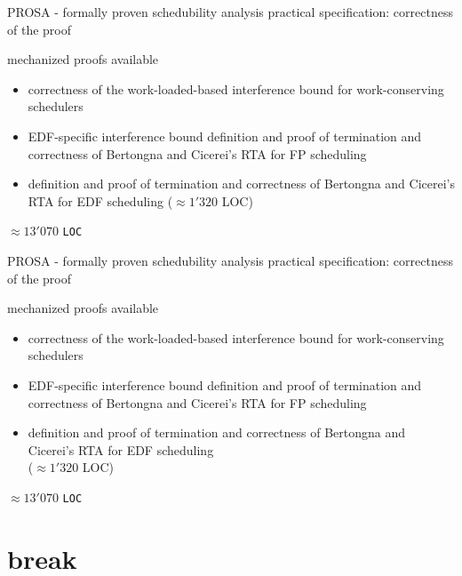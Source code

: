\documentclass{beamer}
\begin{document}
	
	\begin{frame}{PROSA - formally proven schedubility analysis}
	 	  practical specification: correctness of the proof
	 		   
	   	\begin{block}{mechanized proofs available}
	   	\begin{itemize}
			\item correctness of  the work-loaded-based interference bound  for work-conserving schedulers 
			\item EDF-specific interference bound definition and proof of termination and correctness  of Bertongna and Cicerei's RTA for FP scheduling
			 \item definition and proof of termination and correctness of Bertongna and Cicerei's RTA for EDF scheduling ($\approx 1'320$ LOC)    	   
	   	\end{itemize} 
	    \end{block}	
		$\approx 13'070$ \texttt{LOC}
 	\end{frame}
 	
 	
 	
		\begin{frame}{PROSA - formally proven schedubility analysis}
	 	  practical specification: correctness of the proof
	 		   
		   	\begin{block}{mechanized proofs available}
			   	\begin{itemize}
					\item correctness of  the work-loaded-based interference bound  for work-conserving schedulers 
					\item EDF-specific interference bound definition and proof of termination and correctness  of Bertongna and Cicerei's RTA for FP scheduling
					 \item \alert{definition} \alert{and} \alert{proof} \alert{of} \alert{termination} \alert{and} \alert{correctness} \alert{of} \alert{Bertongna} \alert{and} \alert{Cicerei's} \alert{RTA} \alert{for} \alert{EDF} \alert{scheduling} \\($\approx 1'320$ LOC)    	   
			   	\end{itemize} 
		    \end{block}	
		$\approx 13'070$ \texttt{LOC}
 	\end{frame}
	\section{break}
 	
\end{document}
